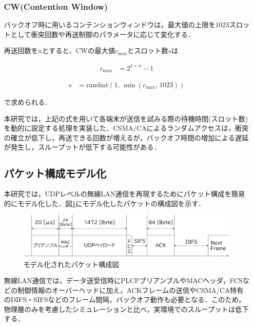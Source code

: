 \documentclass[a4paper, 10pt]{ltjsarticle}
\begin{document}
\subsubsection{CW(Contention Window)}

バックオフ時に用いるコンテンションウィンドウは，最大値の上限を1023スロットとして衝突回数や再送制御のパラメータに応じて変化する．

再送回数を$n$とすると、CWの最大値$c_{\max}$とスロット数$s$は


\begin{align}
  c_{\max} &= 2^{4 + n} - 1
\end{align}

\begin{align}
  s &= \mathrm{randint}(1, \, \min(c_{\max}, \, 1023))
  \label{slot}
\end{align}

で求められる．

本研究では，上記の式を用いて各端末が送信を試みる際の待機時間(スロット数)を動的に設定する処理を実装した．CSMA/CAによるランダムアクセスは，衝突の確立が低下し，再送できる回数が増えるが，バックオフ時間の増加による遅延が発生し，スループットが低下する可能性がある．

\subsection{パケット構成モデル化}

本研究では，UDPレベルの無線LAN通信を再現するためにパケット構成を簡易的にモデル化した．図\ref{packet}にモデル化したパケットの構成図を示す．



\begin{figure}[H]
  \centering
  \includegraphics[width=1\columnwidth]{./assets/packet.png}
  \caption{モデル化されたパケット構成図}
  \label{packet}
\end{figure}

無線LAN通信では，データ送受信時にPLCPプリアンブルやMACヘッダ，FCSなどの制御情報のオーバーヘッドに加え，ACKフレームの送信やCSMA/CA特有のDIFS・SIFSなどのフレーム間隔，バックオフ動作も必要となる．このため，物理層のみを考慮したシミュレーションと比べ，実環境でのスループットは低下する．
\end{document}
